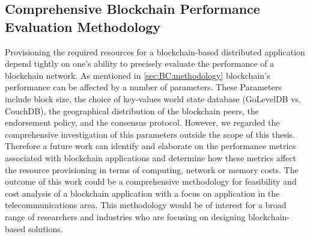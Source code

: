  





\subsection{Comprehensive Blockchain Performance Evaluation Methodology}%
Provisioning the required resources for a blockchain-based distributed application depend tightly on one's ability to precisely evaluate the performance of a blockchain network. As mentioned in \autoref{sec:BC:methodology} blockchain's performance can be affected by a number of parameters. These Parameters include block size, the choice of key-values world state database (GoLevelDB vs. CouchDB), the geographical distribution of the blockchain peers, the endorsement policy, and the consensus protocol. However, we regarded the comprehensive investigation of this parameters outside the scope of this thesis. 
Therefore a future work can identify and elaborate on the performance metrics associated with blockchain applications and determine how these metrics affect the resource provisioning in terms of computing, network or memory costs. 
The outcome of this work could be a comprehensive methodology for feasibility and cost analysis of a blockchain application with a focus on application in the telecommunications area. This methodology would be of interest for a broad range of researchers and industries who are focusing on designing blockchain-based solutions.


